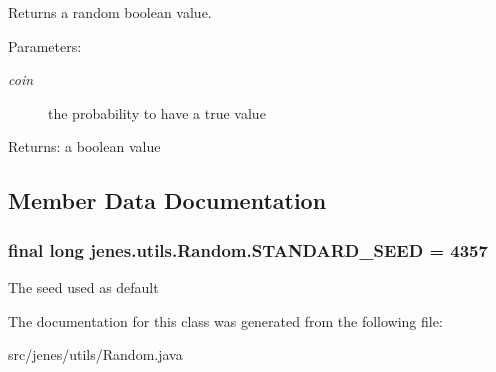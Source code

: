 Returns a random boolean value. 

\begin{Desc}
\item[Parameters:]
\begin{description}
\item[{\em coin}]the probability to have a true value \end{description}
\end{Desc}
\begin{Desc}
\item[Returns:]a boolean value \end{Desc}


\subsection{Member Data Documentation}
\hypertarget{classjenes_1_1utils_1_1_random_ee05c4e6476472dc9dc02d2fd94061b5}{
\subsubsection[STANDARD\_\-SEED]{\setlength{\rightskip}{0pt plus 5cm}final long {\bf jenes.utils.Random.STANDARD\_\-SEED} = 4357}}
\label{classjenes_1_1utils_1_1_random_ee05c4e6476472dc9dc02d2fd94061b5}


The seed used as default 

The documentation for this class was generated from the following file:\begin{CompactItemize}
\item 
src/jenes/utils/Random.java\end{CompactItemize}
